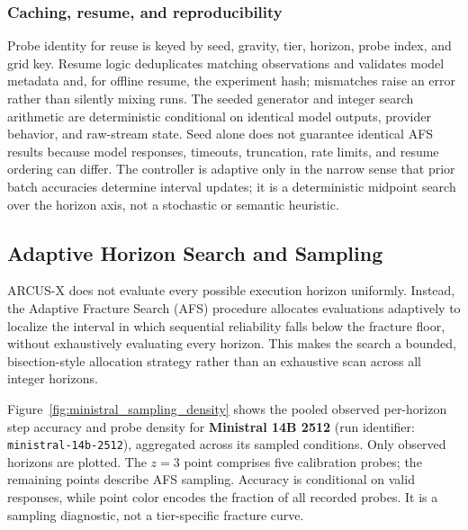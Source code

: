 \documentclass{article}
\begin{document}
\subsubsection{Caching, resume, and reproducibility}
Probe identity for reuse is keyed by seed, gravity, tier, horizon, probe index, and grid key. Resume logic deduplicates matching observations and validates model metadata and, for offline resume, the experiment hash; mismatches raise an error rather than silently mixing runs. The seeded generator and integer search arithmetic are deterministic conditional on identical model outputs, provider behavior, and raw-stream state. Seed alone does not guarantee identical AFS results because model responses, timeouts, truncation, rate limits, and resume ordering can differ. The controller is adaptive only in the narrow sense that prior batch accuracies determine interval updates; it is a deterministic midpoint search over the horizon axis, not a stochastic or semantic heuristic.

\subsection{Adaptive Horizon Search and Sampling}
\label{app:afs_sampling}

ARCUS-X does not evaluate every possible execution horizon uniformly. Instead, the Adaptive Fracture Search (AFS) procedure allocates evaluations adaptively to localize the interval in which sequential reliability falls below the fracture floor, without exhaustively evaluating every horizon. This makes the search a bounded, bisection-style allocation strategy rather than an exhaustive scan across all integer horizons.

Figure~\ref{fig:ministral_sampling_density} shows the pooled observed per-horizon step accuracy and probe density for \textbf{Ministral 14B 2512} (run identifier: \texttt{ministral-14b-2512}), aggregated across its sampled conditions. Only observed horizons are plotted. The $z=3$ point comprises five calibration probes; the remaining points describe AFS sampling. Accuracy is conditional on valid responses, while point color encodes the fraction of all recorded probes. It is a sampling diagnostic, not a tier-specific fracture curve.
\end{document}
